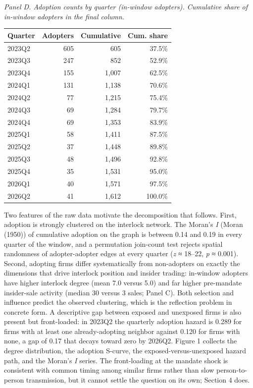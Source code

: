 \documentclass[
  a4paper,
]{article}
\begin{document}
\emph{Panel D. Adoption counts by quarter (in-window adopters).
Cumulative share of in-window adopters in the final column.}

\begin{longtable}[]{@{}lrrr@{}}
\toprule\noalign{}
Quarter & Adopters & Cumulative & Cum. share \\
\midrule\noalign{}
\endhead
\bottomrule\noalign{}
\endlastfoot
2023Q2 & 605 & 605 & 37.5\% \\
2023Q3 & 247 & 852 & 52.9\% \\
2023Q4 & 155 & 1,007 & 62.5\% \\
2024Q1 & 131 & 1,138 & 70.6\% \\
2024Q2 & 77 & 1,215 & 75.4\% \\
2024Q3 & 69 & 1,284 & 79.7\% \\
2024Q4 & 69 & 1,353 & 83.9\% \\
2025Q1 & 58 & 1,411 & 87.5\% \\
2025Q2 & 37 & 1,448 & 89.8\% \\
2025Q3 & 48 & 1,496 & 92.8\% \\
2025Q4 & 35 & 1,531 & 95.0\% \\
2026Q1 & 40 & 1,571 & 97.5\% \\
2026Q2 & 41 & 1,612 & 100.0\% \\
\end{longtable}

Two features of the raw data motivate the decomposition that follows.
First, adoption is strongly clustered on the interlock network. The
Moran's \emph{I} (Moran (1950)) of cumulative adoption on the graph is
between 0.14 and 0.19 in every quarter of the window, and a permutation
join-count test rejects spatial randomness of adopter-adopter edges at
every quarter (\emph{z} ≈ 18--22, \emph{p} ≈ 0.001). Second, adopting
firms differ systematically from non-adopters on exactly the dimensions
that drive interlock position and insider trading: in-window adopters
have higher interlock degree (mean 7.0 versus 5.0) and far higher
pre-mandate insider-sale activity (median 30 versus 3 sales; Panel C).
Both selection and influence predict the observed clustering, which is
the reflection problem in concrete form. A descriptive gap between
exposed and unexposed firms is also present but front-loaded: in 2023Q2
the quarterly adoption hazard is 0.289 for firms with at least one
already-adopting neighbor against 0.120 for firms with none, a gap of
0.17 that decays toward zero by 2026Q2. Figure 1 collects the degree
distribution, the adoption S-curve, the exposed-versus-unexposed hazard
path, and the Moran's \emph{I} series. The front-loading at the mandate
shock is consistent with common timing among similar firms rather than
slow person-to-person transmission, but it cannot settle the question on
its own; Section 4 does.
\end{document}
